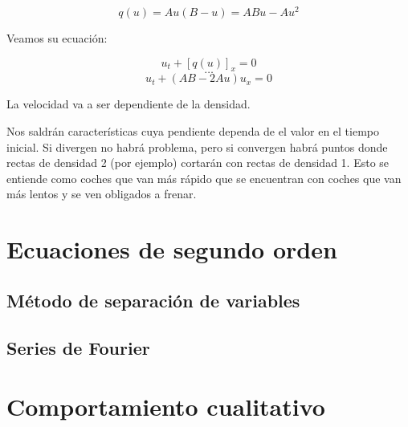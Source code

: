 \documentclass[palatino]{apuntes}
\begin{document}
$$ q(u) = Au (B-u) = ABu - Au^{2} $$

Veamos su ecuación:

$$u_t + [q(u)]_x = 0$$
$$ … $$
$$ u_t + (AB - 2Au) u_x = 0 $$

La velocidad va a ser dependiente de la densidad.

Nos saldrán características cuya pendiente dependa de el valor en el tiempo inicial. Si divergen no habrá problema, pero si convergen habrá puntos donde rectas de densidad 2 (por ejemplo) cortarán con rectas de densidad 1. Esto se entiende como coches que van más rápido que se encuentran con coches que van más lentos y se ven obligados a frenar.






\chapter{Ecuaciones de segundo orden}
\label{chap:EcuacionesSegundoOrden}

\section{Método de separación de variables}

\section{Series de Fourier}

\chapter{Comportamiento cualitativo}

\appendix

{}
\printindex
\end{document}
